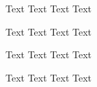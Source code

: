 \documentclass[
    a4paper,
    fontsize=11pt,
]{scrartcl}
\begin{document}

Text Text Text Text


Text Text Text Text


Text Text Text Text


Text Text Text Text
\end{document}
